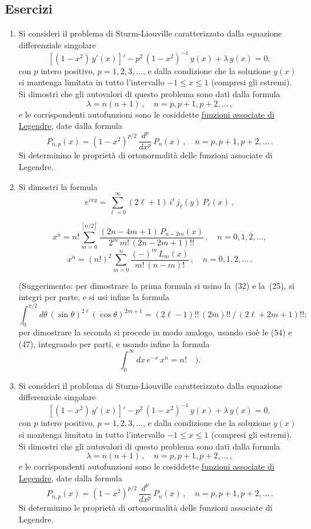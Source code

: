 \documentclass[11pt, a4paper]{book}
\numberwithin{equation}{section}
\newenvironment{esercizi}{\subsection*{Esercizi}\begin{enumerate}}{\end{enumerate}}
\begin{document}
\begin{esercizi}
\begin{enumerate}
\item[*] Si consideri il problema di Sturm-Liouville caratterizzato dalla equazione differenziale singolare
\[
\left[(1-x^2)\,y'(x)\right]' - p^2\,(1-x^2)^{-1}\,y(x) + \lambda\, y(x) = 0,
\]
con $p$ intero positivo, $p=1,2,3,\ldots$, e dalla condizione che la soluzione $y(x)$ si mantenga limitata in tutto l'intervallo $-1\le x\le 1$ (compresi gli estremi). Si dimostri che gli autovalori di questo problema sono dati dalla formula
\[
\lambda = n(n+1)\,, \quad n = p, p+1, p+2, \ldots\,,
\]
e le corrispondenti autofunzioni sono le cosiddette \uline{funzioni associate di Legendre}, date dalla formula
\[
P_{n,p}(x) = (1-x^2)^{p/2}\,\frac{d^p}{dx^p}\,P_n(x)\,, \quad n=p,p+1,p+2,\ldots\,.
\]
Si determinino le proprietà di ortonormalità delle funzioni associate di Legendre.

\item Si dimostri la formula
\[
e^{ixy} = \sum_{\ell=0}^{\infty}(2\ell+1)\,i^\ell\,j_\ell(y)\,P_\ell(x)\,,
\]





\[
x^n = n!\sum_{m=0}^{[n/2]} \frac{(2n-4m+1)\,P_{n-2m}(x)}{2^m\, m!\,(2n-2m+1)!!}\,, \quad n=0,1,2,\ldots,
\]
\[
x^n = (n!)^2 \sum_{m=0}^{n} \frac{(-)^m\, L_m(x)}{m!\,(n-m)!}\,, \quad n=0,1,2,\ldots\,.
\]

(Suggerimento: per dimostrare la prima formula si usino la~(32) e la~(25), si integri per parte, e si usi infine la formula
\[
\int_0^{\pi/2}d\theta\,(\sin\theta)^{2\ell}(\cos\theta)^{2m+1} = (2\ell-1)!!\,(2m)!!\,/\,(2\ell+2m+1)!!;
\]
per dimostrare la seconda si procede in modo analogo, usando cioè le (54) e (47), integrando per parti, e usando infine la formula
\[
\int_0^{\infty}dx\, e^{-x}\,x^n = n!\quad ).
\]

\item Si consideri il problema di Sturm-Liouville caratterizzato dalla equazione differenziale singolare
\[
\left[(1-x^2)\,y'(x)\right]' - p^2\,(1-x^2)^{-1}\,y(x) + \lambda\,y(x) = 0,
\]
con $p$ intero positivo, $p=1,2,3,\ldots$, e dalla condizione che la soluzione $y(x)$ si mantenga limitata in tutto l'intervallo $-1\le x\le 1$ (compresi gli estremi). Si dimostri che gli autovalori di questo problema sono dati dalla formula
\[
\lambda = n(n+1)\,, \quad n = p, p+1, p+2, \ldots\,,
\]
e le corrispondenti autofunzioni sono le cosiddette \uline{funzioni associate di Legendre}, date dalla formula
\[
P_{n,p}(x) = (1-x^2)^{p/2}\,\frac{d^p}{dx^p}\,P_n(x)\,, \quad n=p,p+1,p+2,\ldots\,.
\]
Si determinino le proprietà di ortonormalità delle funzioni associate di Legendre.


\end{enumerate}
\end{esercizi}
\end{document}

